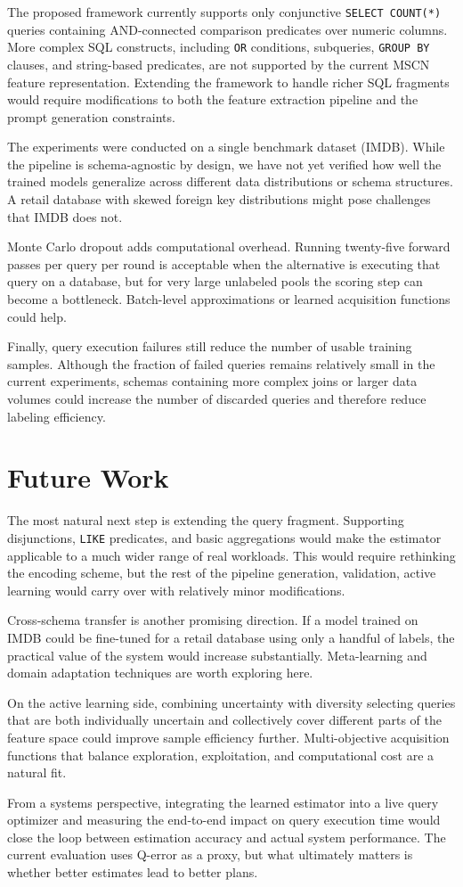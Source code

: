 The proposed framework currently supports only conjunctive \texttt{SELECT COUNT(*)} queries containing AND-connected comparison predicates over numeric columns. More complex SQL constructs, including \texttt{OR} conditions, subqueries, \texttt{GROUP BY} clauses, and string-based predicates, are not supported by the current MSCN feature representation. Extending the framework to handle richer SQL fragments would require modifications to both the feature extraction pipeline and the prompt generation constraints.

The experiments were conducted on a single benchmark dataset (IMDB). While the pipeline is schema-agnostic by design, we have not yet verified how well the trained models generalize across different data distributions or schema structures. A retail database with skewed foreign key distributions might pose challenges that IMDB does not.

Monte Carlo dropout adds computational overhead. Running twenty-five forward passes per query per round is acceptable when the alternative is executing that query on a database, but for very large unlabeled pools the scoring step can become a bottleneck. Batch-level approximations or learned acquisition functions could help.

Finally, query execution failures still reduce the number of usable training
samples. Although the fraction of failed queries remains relatively small in the
current experiments, schemas containing more complex joins or larger data
volumes could increase the number of discarded queries and therefore reduce
labeling efficiency.


\section{Future Work}

The most natural next step is extending the query fragment. Supporting disjunctions, \texttt{LIKE} predicates, and basic aggregations would make the estimator applicable to a much wider range of real workloads. This would require rethinking the encoding scheme, but the rest of the pipeline generation, validation, active learning would carry over with relatively minor modifications.

Cross-schema transfer is another promising direction. If a model trained on IMDB could be fine-tuned for a retail database using only a handful of labels, the practical value of the system would increase substantially. Meta-learning and domain adaptation techniques are worth exploring here.

On the active learning side, combining uncertainty with diversity selecting queries that are both individually uncertain and collectively cover different parts of the feature space could improve sample efficiency further. Multi-objective acquisition functions that balance exploration, exploitation, and computational cost are a natural fit.

From a systems perspective, integrating the learned estimator into a live query optimizer and measuring the end-to-end impact on query execution time would close the loop between estimation accuracy and actual system performance. The current evaluation uses Q-error as a proxy, but what ultimately matters is whether better estimates lead to better plans.